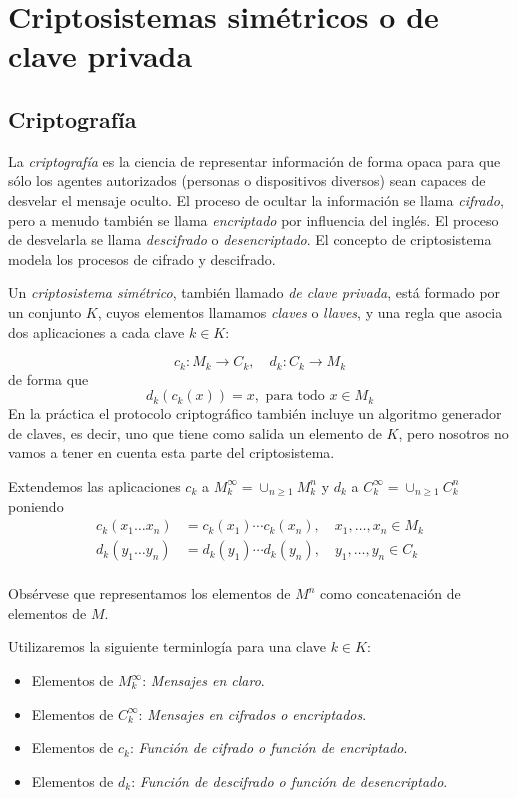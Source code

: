 
\chapter{Criptosistemas simétricos o de clave privada}

\section {Criptografía}

La {\it criptografía} es la ciencia de representar información de forma opaca para que sólo los agentes autorizados (personas o dispositivos diversos) sean capaces de desvelar el mensaje oculto. El proceso de ocultar la información se llama {\it cifrado}, pero a menudo también se llama {\it encriptado} por influencia del inglés. El proceso de desvelarla se llama {\it descifrado} o {\it desencriptado}. El concepto de criptosistema modela los procesos de cifrado y descifrado.

Un {\it criptosistema simétrico}, también llamado {\it de clave privada}, está formado por un conjunto $K$, cuyos elementos llamamos {\it claves} o {\it llaves}, y una regla que asocia dos aplicaciones a cada clave $k\in K$:

$$c_k:M_k\longrightarrow C_k, \quad d_k:C_k\longrightarrow M_k$$
de forma que 
$$d_k(c_k(x))=x, \text{ para todo } x\in M_k$$ 
En la práctica el protocolo criptográfico también incluye un algoritmo generador de claves, es decir, uno que tiene como salida un elemento de $K$, pero nosotros no vamos a tener en cuenta esta parte del criptosistema.

Extendemos las aplicaciones $c_k$ a $M_k^{\infty}=\cup_{n\geq 1}M_k^n$ y $d_k$ a $C_k^{\infty}=\cup_{n\geq 1}C_k^n$ poniendo
\begin{equation*}
    \begin{split}
        c_k(x_1\dots x_n) &= c_k(x_1)\cdots c_k(x_n), \quad x_1,\dots,x_n\in M_k \\
        d_k(y_1\dots y_n) &= d_k(y_1)\cdots d_k(y_n), \quad y_1,\dots,y_n\in C_k \\
    \end{split}
\end{equation*}

Obsérvese que representamos los elementos de $M^n$ como concatenación de elementos de $M$.

Utilizaremos la siguiente terminlogía para una clave $k\in K$:

\begin{itemize}[label=--]
    \item Elementos de $M_k^\infty$: {\it Mensajes en claro}.
    \item Elementos de $C_k^\infty$: {\it Mensajes en cifrados o encriptados}.
    \item Elementos de $c_k$: {\it Función de cifrado o función de encriptado}.
    \item Elementos de $d_k$: {\it Función de descifrado o función de desencriptado}.
\end{itemize}

